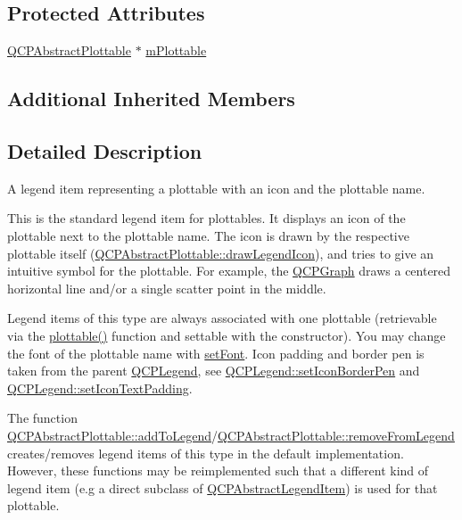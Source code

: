\subsection*{Protected Attributes}
\begin{DoxyCompactItemize}
\item 
\hyperlink{classQCPAbstractPlottable}{Q\+C\+P\+Abstract\+Plottable} $\ast$ \hyperlink{classQCPPlottableLegendItem_ada647fb4b22971a1a424e15b4f6af0d9}{m\+Plottable}
\end{DoxyCompactItemize}
\subsection*{Additional Inherited Members}


\subsection{Detailed Description}
A legend item representing a plottable with an icon and the plottable name. 

This is the standard legend item for plottables. It displays an icon of the plottable next to the plottable name. The icon is drawn by the respective plottable itself (\hyperlink{classQCPAbstractPlottable_a9a450783fd9ed539e589999fd390cdf7}{Q\+C\+P\+Abstract\+Plottable\+::draw\+Legend\+Icon}), and tries to give an intuitive symbol for the plottable. For example, the \hyperlink{classQCPGraph}{Q\+C\+P\+Graph} draws a centered horizontal line and/or a single scatter point in the middle.

Legend items of this type are always associated with one plottable (retrievable via the \hyperlink{classQCPPlottableLegendItem_af29e9a2c60b4cba0cac2447b8af7b488}{plottable()} function and settable with the constructor). You may change the font of the plottable name with \hyperlink{classQCPAbstractLegendItem_a409c53455d8112f71d70c0c43eb10265}{set\+Font}. Icon padding and border pen is taken from the parent \hyperlink{classQCPLegend}{Q\+C\+P\+Legend}, see \hyperlink{classQCPLegend_a2f2c93d18a651f4ff294bb3f026f49b8}{Q\+C\+P\+Legend\+::set\+Icon\+Border\+Pen} and \hyperlink{classQCPLegend_a62973bd69d5155e8ea3141366e8968f6}{Q\+C\+P\+Legend\+::set\+Icon\+Text\+Padding}.

The function \hyperlink{classQCPAbstractPlottable_a70f8cabfd808f7d5204b9f18c45c13f5}{Q\+C\+P\+Abstract\+Plottable\+::add\+To\+Legend}/\hyperlink{classQCPAbstractPlottable_aa1f350e510326d012b9a9c9249736c83}{Q\+C\+P\+Abstract\+Plottable\+::remove\+From\+Legend} creates/removes legend items of this type in the default implementation. However, these functions may be reimplemented such that a different kind of legend item (e.\+g a direct subclass of \hyperlink{classQCPAbstractLegendItem}{Q\+C\+P\+Abstract\+Legend\+Item}) is used for that plottable.

